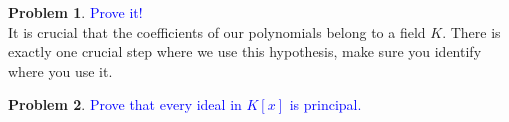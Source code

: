 \documentclass[11pt]{article}
\theoremstyle{definition}
\newtheorem{problem}{Problem}[section]
\numberwithin{equation}{subsection}
\newcommand{\blue}[1]{\textcolor{blue}{#1}}
\begin{document}
\begin{problem}
    \blue{Prove it!}\\
    It is crucial that the coefficients of our polynomials belong to a field $K$.
    There is exactly one crucial step where we use this hypothesis, make sure you identify where you use it.
\end{problem}

\begin{problem}
    \blue{Prove that every ideal in $K[x]$ is principal.}
\end{problem}
\end{document}
